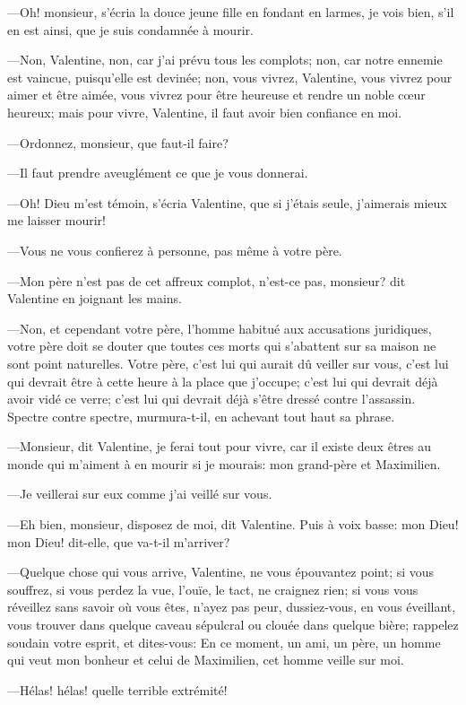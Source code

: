 —Oh! monsieur, s'écria la douce jeune fille en fondant en larmes, je vois bien, s'il en est ainsi, que je suis condamnée à mourir. 

—Non, Valentine, non, car j'ai prévu tous les complots; non, car notre ennemie est vaincue, puisqu'elle est devinée; non, vous vivrez, Valentine, vous vivrez pour aimer et être aimée, vous vivrez pour être heureuse et rendre un noble cœur heureux; mais pour vivre, Valentine, il faut avoir bien confiance en moi. 

—Ordonnez, monsieur, que faut-il faire? 

—Il faut prendre aveuglément ce que je vous donnerai. 

—Oh! Dieu m'est témoin, s'écria Valentine, que si j'étais seule, j'aimerais mieux me laisser mourir! 

—Vous ne vous confierez à personne, pas même à votre père. 

—Mon père n'est pas de cet affreux complot, n'est-ce pas, monsieur? dit Valentine en joignant les mains. 

—Non, et cependant votre père, l'homme habitué aux accusations juridiques, votre père doit se douter que toutes ces morts qui s'abattent sur sa maison ne sont point naturelles. Votre père, c'est lui qui aurait dû veiller sur vous, c'est lui qui devrait être à cette heure à la place que j'occupe; c'est lui qui devrait déjà avoir vidé ce verre; c'est lui qui devrait déjà s'être dressé contre l'assassin. Spectre contre spectre, murmura-t-il, en achevant tout haut sa phrase. 

—Monsieur, dit Valentine, je ferai tout pour vivre, car il existe deux êtres au monde qui m'aiment à en mourir si je mourais: mon grand-père et Maximilien. 

—Je veillerai sur eux comme j'ai veillé sur vous. 

—Eh bien, monsieur, disposez de moi, dit Valentine. Puis à voix basse: mon Dieu! mon Dieu! dit-elle, que va-t-il m'arriver? 

—Quelque chose qui vous arrive, Valentine, ne vous épouvantez point; si vous souffrez, si vous perdez la vue, l'ouïe, le tact, ne craignez rien; si vous vous réveillez sans savoir où vous êtes, n'ayez pas peur, dussiez-vous, en vous éveillant, vous trouver dans quelque caveau sépulcral ou clouée dans quelque bière; rappelez soudain votre esprit, et dites-vous: En ce moment, un ami, un père, un homme qui veut mon bonheur et celui de Maximilien, cet homme veille sur moi. 

—Hélas! hélas! quelle terrible extrémité! 


